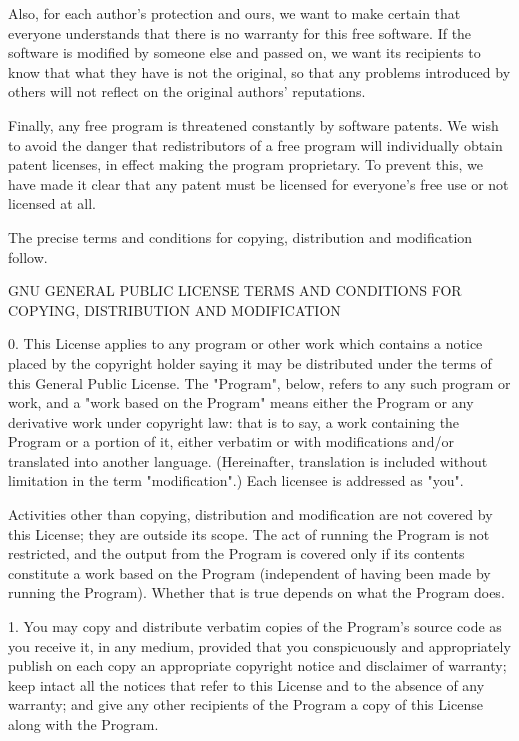 Also, for each author's protection and ours, we want to make certain
that everyone understands that there is no warranty for this free
software.  If the software is modified by someone else and passed on, we
want its recipients to know that what they have is not the original, so
that any problems introduced by others will not reflect on the original
authors' reputations.

Finally, any free program is threatened constantly by software
patents.  We wish to avoid the danger that redistributors of a free
program will individually obtain patent licenses, in effect making the
program proprietary.  To prevent this, we have made it clear that any
patent must be licensed for everyone's free use or not licensed at all.

The precise terms and conditions for copying, distribution and
modification follow.

GNU GENERAL PUBLIC LICENSE
TERMS AND CONDITIONS FOR COPYING, DISTRIBUTION AND MODIFICATION

0. This License applies to any program or other work which contains
a notice placed by the copyright holder saying it may be distributed
under the terms of this General Public License.  The "Program", below,
refers to any such program or work, and a "work based on the Program"
means either the Program or any derivative work under copyright law:
that is to say, a work containing the Program or a portion of it,
either verbatim or with modifications and/or translated into another
language.  (Hereinafter, translation is included without limitation in
the term "modification".)  Each licensee is addressed as "you".

Activities other than copying, distribution and modification are not
covered by this License; they are outside its scope.  The act of
running the Program is not restricted, and the output from the Program
is covered only if its contents constitute a work based on the
Program (independent of having been made by running the Program).
Whether that is true depends on what the Program does.

1. You may copy and distribute verbatim copies of the Program's
source code as you receive it, in any medium, provided that you
conspicuously and appropriately publish on each copy an appropriate
copyright notice and disclaimer of warranty; keep intact all the
notices that refer to this License and to the absence of any warranty;
and give any other recipients of the Program a copy of this License
along with the Program.


